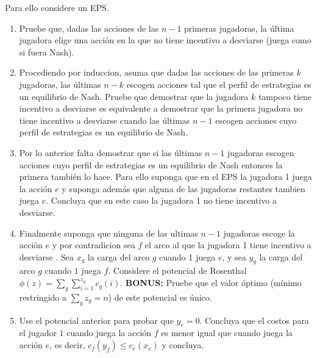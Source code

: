 \documentclass[11pt, spanish]{article}
\theoremstyle{plain}
\begin{document}
\begin{itemize}
\begin{enumerate}
Para ello considere un EPS.
\begin{enumerate}[i]
  \item Pruebe que, dadas las acciones de las $n-1$ primeras jugadoras, la última jugadora elige una acci\'on en la que no tiene incentivo a desviarse (juega como si fuera Nash).
  \item Procediendo por induccion, asuma que dadas las acciones de las primeras $k$ jugadoras, las \'ultimas $n-k$ escogen acciones tal que el perfil de estrategias es un equilibrio de Nash.
   Pruebe que demostrar que la jugadora $k$ tampoco tiene incentivo a desviarse es equivalente a demostrar que la primera jugadora no tiene incentivo a desviarse cuando las \'ultimas $n-1$ escogen acciones cuyo perfil de estrategias es un equilibrio de Nash.
  \item Por lo anterior falta demostrar que si las  \'ultimas $n-1$ jugadoras escogen acciones cuyo perfil de estrategias es un equilibrio de Nash entonces la primera tambi\'en lo hace. Para ello suponga que en el EPS la jugadora 1 juega la acci\'on $e$ y suponga adem\'as que alguna de las jugadoras restantes tambien juega $e$. Concluya que en este caso la jugadora 1 no tiene incentivo a desviarse.
  \item Finalmente suponga que ninguna de las ultimas $n-1$ jugadoras escoge la acci\'on $e$ y por contradicion sea $f$ el arco al que la jugadora 1 tiene incentivo a desviarse . Sea $x_g$ la carga del arco $g$ cuando 1 juega $e$, y sea $y_g$ la carga del arco $g$ cuando $1$ juega $f$.  Considere el potencial de Rosenthal $\phi(z)=\sum_g\sum_{i=1}^{z_g} c_g(i)$. \textbf{BONUS:} Pruebe que el valor \'optimo (m\'inimo restringido a $\sum_g z_g=n$) de este potencial es \'unico. 
  \item Use el potencial anterior para probar que $y_e=0$. Concluya que el costos para el jugador $1$ cuando juega la acci\'on $f$ es menor igual que cuando juega la acci\'on $e$, es decir, $c_f(y_f) \leq c_e(x_e)$ y concluya.
\end{enumerate}


  \end{enumerate}

\end{itemize}
\end{document}
